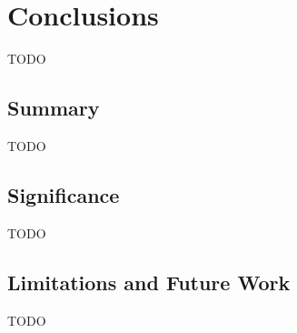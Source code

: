 \chapter{Conclusions}\label{ch:concl} TODO

\section{Summary}
TODO

\section{Significance}
TODO

\section{Limitations and Future Work}
TODO
